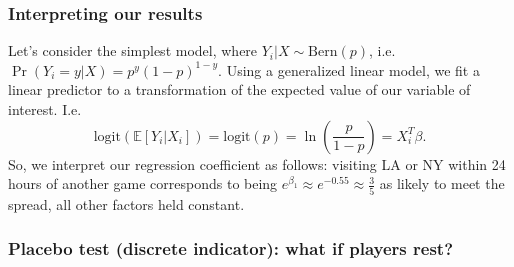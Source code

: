 \documentclass{beamer}
\begin{document}
\begin{frame}   \frametitle{Interpreting our results}
  Let's consider the simplest model, where $Y_i | X \sim \textrm{Bern}(p)$, i.e.
  $\Pr(Y_i = y | X) = p^{y} (1-p)^{1-y}$. Using a generalized linear model,
  we fit a linear predictor to a transformation of the expected value of our
  variable of interest. I.e.
  \[
    \textrm{logit} \left( \mathbb E[Y_i | X_i]\right) = \textrm{logit} \left(p\right) = \ln \left( \frac{p}{1-p}\right) = X_i^T \beta.
  \]
  So, we interpret our regression coefficient as follows: visiting LA or NY within
  24 hours of another game corresponds to being $e^{\beta_1} \approx e^{-0.55} \approx \frac{3}{5}$
  as likely to meet the spread, all other factors held constant. 
\end{frame}


\begin{frame}   \frametitle{Placebo test (discrete indicator): what if players rest?}
  \centering
  \tiny{ %
}
\end{frame}
\end{document}
